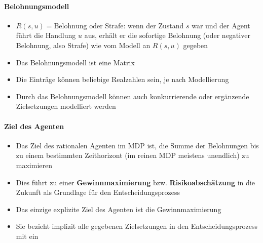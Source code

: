 \paragraph{Belohnungsmodell}
\begin{itemize}
	\item $R(s,u) = \text{Belohnung oder Strafe}$: wenn der Zustand $s$ war und der Agent f\"uhrt die Handlung $u$ aus, erh\"alt er die sofortige Belohnung (oder negativer Belohnung, also Strafe) wie vom Modell an $R(s,u)$ gegeben
	\item Das Belohnungsmodell ist eine Matrix
	\item Die Eintr\"age k\"onnen beliebige Realzahlen sein, je nach Modellierung
	\item Durch das Belohnungsmodell k\"onnen auch konkurrierende oder erg\"anzende Zielsetzungen modelliert werden
\end{itemize}

\paragraph{Ziel des Agenten}
\begin{itemize}
	\item Das Ziel des rationalen Agenten im MDP ist, die Summe der Belohnungen bis zu einem bestimmten Zeithorizont (im reinen MDP meistens unendlich) zu maximieren
	\item Dies f\"uhrt zu einer \textbf{Gewinnmaximierung} bzw. \textbf{Risikoabsch\"atzung} in die Zukunft als Grundlage f\"ur den Entscheidungsprozess
	\item Das einzige explizite Ziel des Agenten ist die Gewinnmaximierung
	\item Sie bezieht implizit alle gegebenen Zielsetzungen in den Entscheidungsprozess mit ein
\end{itemize}


